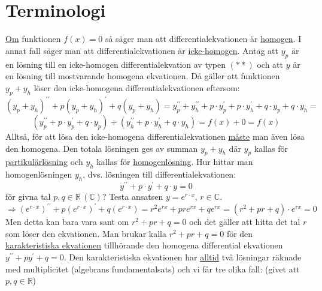 \section*{Terminologi}
\underline{Om} funktionen $f(x)=0$ så säger man att differentialekvationen är \underline{homogen}.
I annat fall säger man att differentialekvationen är \underline{icke-homogen}.
Antag att $y_p$ är en lösning till en icke-homogen differentialekvation av typen $(**)$ och att $y$ är en lösning till mostvarande homogena ekvationen.
Då gäller att funktionen $y_p+y_h$ löser den icke-homogena differentialekvationen eftersom:
\begin{equation*}
    (y_p+y_h)^{\prime\prime}+p(y_p+y_h)^\prime+q(y_p+y_h)=
    y_p^{\prime\prime}+y_h^{\prime\prime}+p\cdot y_p^\prime+p\cdot y_h^\prime+q\cdot y_p+q\cdot y_h=
\end{equation*}
\begin{equation*}
    (y_p^{\prime\prime}+p\cdot y_p^\prime+q\cdot y_p)+(y_h^{\prime\prime}+p\cdot y_h^\prime+q\cdot y_h)=
    f(x)+0=
    f(x)
\end{equation*}
Alltså, för att lösa den icke-homogena differentialekvationen \underline{måste} man även lösa den homogena.
Den totala lösningen ges av summan $y_p+y_h$ där $y_p$ kallas för \underline{partikulärlösning} och $y_h$ kallas för \underline{homogenlösning}.
Hur hittar man homogenlösningen $y_h$, dvs. lösningen till differentialekvationen:
\begin{equation*}
    y^{\prime\prime}+p\cdot y^\prime+q\cdot y=0
\end{equation*}
för givna tal $p,q\in\mathbb{R}\, (\mathbb{C})$?
Testa ansatsen $y=e^{r\cdot x},\, r\in\mathbb{C}$.
\begin{equation*}
    \Rightarrow(e^{r\cdot x})^{\prime\prime}+p(e^{r\cdot x})^\prime+q(e^{r\cdot x})=
    r^2e^{rx}+pre^{rx}+qe^{rx}=
    (r^2+pr+q)\cdot e^{rx}=0
\end{equation*}
Men detta kan bara vara sant om $r^2+pr+q=0$ och det gäller att hitta det tal $r$ som löser den ekvationen.
Man brukar kalla $r^2+pr+q=0$ för den \underline{karakteristiska ekvationen} tillhörande den homogena differential ekvationen $y^{\prime\prime}+py^\prime+q=0$.
Den karakteristiska ekvationen har \underline{alltid} två lösningar räknade med multiplicitet (algebrans fundamentalsats) och vi får tre olika fall:
(givet att $p,q\in\mathbb{R}$)
